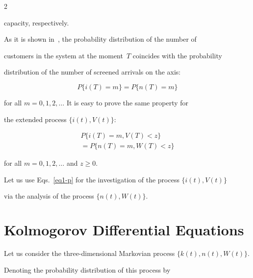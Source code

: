 \begin{multicols}{2}
{}










\addtocounter{figure}{1}





\noindent


 capacity, respectively. 


As it is shown in~\cite{lit4}, the probability distribution of the number of 


customers in the system at the moment~$T$ coincides with the probability 


distribution of the number of screened arrivals on the axis:


$$


P\{i(T)=m\}=P\{n(T)=m\}


$$


for all $m=0,1,2,\ldots$ It is easy to prove the same property for 


the extended process $\{i(t),V(t)\}$:


\begin{multline}


\label{eq1-p}


P\{i(T)=m,V(T)<z\}\\


{}=P\{n(T)=m,W(T)<z\}


\end{multline}


for all $m=0,1,2,\ldots$ and $z\ge 0$. 


Let us use Eqs.~\eqref{eq1-p} for the investigation of the process $\{i(t),V(t)\}$ 


via the analysis of the process $\{n(t),W(t)\}$.





\section{Kolmogorov Differential Equations}





\noindent


Let us consider the three-dimensional Markovian process $\{k(t),n(t),W(t)\}$. 


Denoting the probability distribution of this process by 



\end{multicols}
